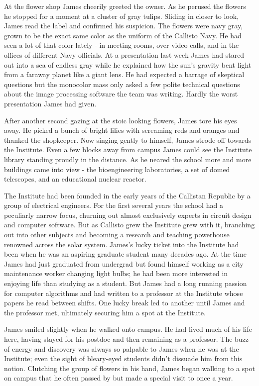 \documentclass[12pt]{article} %
\begin{document}
At the flower shop James cheerily greeted the owner. As he perused the flowers he stopped for a moment at a cluster of gray tulips. Sliding in closer to look, James read the label and confirmed his suspicion. The flowers were navy gray, grown to be the exact same color as the uniform of the Callisto Navy. He had seen a lot of that color lately - in meeting rooms, over video calls, and in the offices of different Navy officials. At a presentation last week James had stared out into a sea of endless gray while he explained how the sun's gravity bent light from a faraway planet like a giant lens. He had expected a barrage of skeptical questions but the monocolor mass only asked a few polite technical questions about the image processing software the team was writing. Hardly the worst presentation James had given.

After another second gazing at the stoic looking flowers, James tore his eyes away. He picked a bunch of bright lilies with screaming reds and oranges and thanked the shopkeeper. Now singing gently to himself, James strode off towards the Institute. Even a few blocks away from campus James could see the Institute library standing proudly in the distance. As he neared the school more and more buildings came into view - the bioengineering laboratories, a set of domed telescopes, and an educational nuclear reactor.

The Institute had been founded in the early years of the Callistan Republic by a group of electrical engineers. For the first several years the school had a peculiarly narrow focus, churning out almost exclusively experts in circuit design and computer software. But as Callisto grew the Institute grew with it, branching out into other subjects and becoming a research and teaching powerhouse renowned across the solar system. James's lucky ticket into the Institute had been when he was an aspiring graduate student many decades ago. At the time James had just graduated from undergrad but found himself working as a city maintenance worker changing light bulbs; he had been more interested in enjoying life than studying as a student. But James had a long running passion for computer algorithms and had written to a professor at the Institute whose papers he read between shifts. One lucky break led to another until James and the professor met, ultimately securing him a spot at the Institute.

James smiled slightly when he walked onto campus. He had lived much of his life here, having stayed for his postdoc and then remaining as a professor. The buzz of energy and discovery was always so palpable to James when he was at the Institute; even the sight of bleary-eyed students didn't dissuade him from this notion. Clutching the group of flowers in his hand, James began walking to a spot on campus that he often passed by but made a special visit to once a year.
\end{document}
